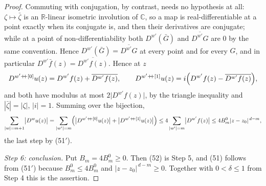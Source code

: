 \begin{proof}
Commuting with conjugation, by contrast, needs no hypothesis at all:
$\zeta\mapsto\bar\zeta$ is an $\mathbb{R}$-linear isometric involution of
$\mathbb{C}$, so a map is real-differentiable at a point exactly when its
conjugate is, and then their derivatives are conjugate; while at a point of
non-differentiability both $D^{w'}(\bar G)$ and $\overline{D^{w'}G}$ are $0$ by
the same convention.  Hence $D^{w'}(\bar G)=\overline{D^{w'}G}$ at every point
and for every $G$, and in particular $D^{w'}\bar f(z)=\overline{D^{w'}f(z)}$.
Hence at $z$
\[
  D^{w'+\!\!+[0]}u(z)=D^{w'}f(z)+\overline{D^{w'}f(z)},\qquad
  D^{w'+\!\!+[1]}u(z)=i\Bigl(D^{w'}f(z)-\overline{D^{w'}f(z)}\Bigr),
\]
and both have modulus at most $2\bigl|D^{w'}f(z)\bigr|$, by the triangle
inequality and $|\bar\zeta|=|\zeta|$, $|i|=1$.  Summing over the bijection,
\[
  \sum_{|w|=m+1}\bigl|D^{w}u(z)\bigr|
  =\sum_{|w'|=m}\Bigl(\bigl|D^{w'+\!\!+[0]}u(z)\bigr|
     +\bigl|D^{w'+\!\!+[1]}u(z)\bigr|\Bigr)
  \le4\sum_{|w'|=m}\bigl|D^{w'}f(z)\bigr|
  \le4B^{0}_m|z-z_0|^{\,d-m},
\]
the last step by (51$'$).

\emph{Step 6: conclusion.}  Put $B_m=4B^{0}_m\ge0$.  Then (52) is Step 5, and
(51) follows from (51$'$) because $B^{0}_m\le4B^{0}_m$ and
$|z-z_0|^{\,d-m}\ge0$.  Together with $0<\delta\le1$ from Step 4 this is the
assertion.
\end{proof}
